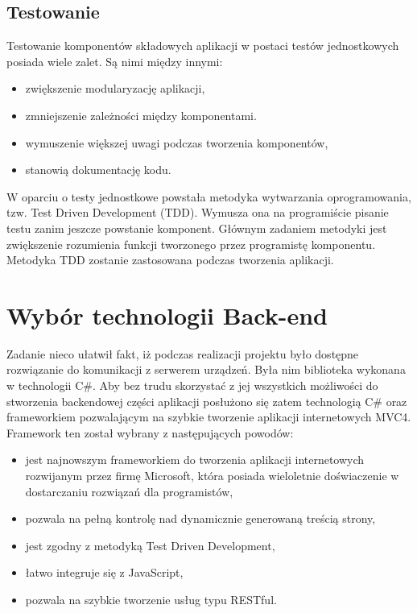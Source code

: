 \subsection{Testowanie}
Testowanie komponentów składowych aplikacji w postaci testów jednostkowych posiada wiele zalet. Są nimi między innymi\cite{tests-book}:
\begin{itemize}
\item zwiększenie modularyzację aplikacji,
\item zmniejszenie zależności między komponentami.
\item wymuszenie większej uwagi podczas tworzenia komponentów,
\item stanowią dokumentację kodu.
\end{itemize}

W oparciu o testy jednostkowe powstała metodyka wytwarzania oprogramowania, tzw. Test Driven Development (TDD)\cite{tests-book}. Wymusza ona na programiście pisanie testu zanim jeszcze powstanie komponent. Głównym zadaniem metodyki jest zwiększenie rozumienia funkcji tworzonego przez programistę komponentu. 
Metodyka TDD zostanie zastosowana podczas tworzenia aplikacji.

\section{Wybór technologii Back-end}

Zadanie nieco ułatwił fakt, iż podczas realizacji projektu było dostępne rozwiązanie do komunikacji z serwerem urządzeń. Była nim biblioteka wykonana w technologii C\#. Aby bez trudu skorzystać z jej wszystkich możliwości do stworzenia backendowej części aplikacji posłużono się zatem technologią C\# oraz frameworkiem pozwalającym na szybkie tworzenie aplikacji internetowych MVC4. Framework ten został wybrany z następujących powodów\cite{mvc-book}:

\begin{itemize}
\item jest najnowszym frameworkiem do tworzenia aplikacji internetowych rozwijanym przez firmę Microsoft, która posiada wieloletnie doświaczenie w dostarczaniu rozwiązań dla programistów,
\item pozwala na pełną kontrolę nad dynamicznie generowaną treścią strony,
\item jest zgodny z metodyką Test Driven Development,
\item łatwo integruje się z JavaScript,
\item pozwala na szybkie tworzenie usług typu RESTful.
\end{itemize}


